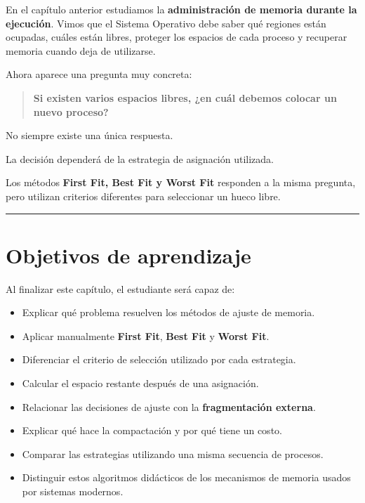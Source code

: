 \documentclass[
  spanish,
  letterpaper,
]{scrbook}
\providecommand{\tightlist}{%
  \setlength{\itemsep}{0pt}\setlength{\parskip}{0pt}}
\begin{document}
En el capítulo anterior estudiamos la \textbf{administración de memoria
durante la ejecución}. Vimos que el Sistema Operativo debe saber qué
regiones están ocupadas, cuáles están libres, proteger los espacios de
cada proceso y recuperar memoria cuando deja de utilizarse.

Ahora aparece una pregunta muy concreta:

\begin{quote}
\textbf{Si existen varios espacios libres, ¿en cuál debemos colocar un
nuevo proceso?}
\end{quote}

No siempre existe una única respuesta.

La decisión dependerá de la estrategia de asignación utilizada.

\begin{tcolorbox}[enhanced jigsaw, arc=.35mm, bottomrule=.15mm, bottomtitle=1mm, breakable, colback=white, colbacktitle=quarto-callout-tip-color!10!white, colframe=quarto-callout-tip-color-frame, coltitle=black, left=2mm, leftrule=.75mm, opacityback=0, opacitybacktitle=0.6, rightrule=.15mm, title=\textcolor{quarto-callout-tip-color}{\faLightbulb}\hspace{0.5em}{Idea central}, titlerule=0mm, toprule=.15mm, toptitle=1mm]

Los métodos \textbf{First Fit, Best Fit y Worst Fit} responden a la
misma pregunta, pero utilizan criterios diferentes para seleccionar un
hueco libre.

\end{tcolorbox}

\begin{center}\rule{0.5\linewidth}{0.5pt}\end{center}


\chapter{Objetivos de aprendizaje}\label{objetivos-de-aprendizaje-11}

Al finalizar este capítulo, el estudiante será capaz de:

\begin{itemize}
\tightlist
\item
  Explicar qué problema resuelven los métodos de ajuste de memoria.
\item
  Aplicar manualmente \textbf{First Fit}, \textbf{Best Fit} y
  \textbf{Worst Fit}.
\item
  Diferenciar el criterio de selección utilizado por cada estrategia.
\item
  Calcular el espacio restante después de una asignación.
\item
  Relacionar las decisiones de ajuste con la \textbf{fragmentación
  externa}.
\item
  Explicar qué hace la compactación y por qué tiene un costo.
\item
  Comparar las estrategias utilizando una misma secuencia de procesos.
\item
  Distinguir estos algoritmos didácticos de los mecanismos de memoria
  usados por sistemas modernos.
\end{itemize}
\end{document}
